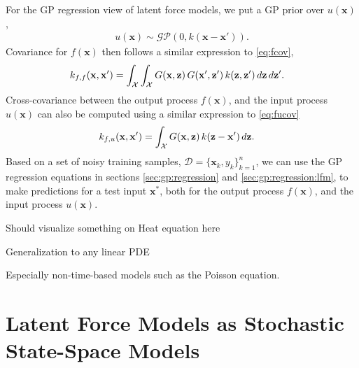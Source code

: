 \documentclass[journal]{IEEEtran}
\newcommand{\simo}[1]{{\color{red}#1}}
\begin{document}
For the GP regression view of latent force models, we put a GP prior over $u(\mathbf{x})$,
\begin{align*}
u(\mathbf{x})\sim\mathcal{GP}(0, k(\mathbf{x} - \mathbf{x}')).
\end{align*}
Covariance for $f(\mathbf{x})$ then follows a similar expression to \eqref{eq:fcov},
\begin{equation}
\begin{split}
  k_{f,f}(\mathbf{x}, \mathbf{x}') &=
  \int_{\mathcal{X}}   \int_{\mathcal{X}}
  G(\mathbf{x}, \mathbf{z}) \, G(\mathbf{x}', \mathbf{z}') \, k(\mathbf{z}, \mathbf{z}') \, d\mathbf{z} \, d\mathbf{z}'.
\end{split}
\notag
\end{equation}
Cross-covariance between the output process $f(\mathbf{x})$, and the input process $u(\mathbf{x})$ can also be computed
using a similar expression to \eqref{eq:fucov}
\begin{align}
k_{f,u}(\mathbf{x},\mathbf{x}') & = \int_{\mathcal{X}} G(\mathbf{x}, \mathbf{z})\, k(\mathbf{z} - \mathbf{x}')\, d\mathbf{z}.
\notag
\end{align}
Based on a set of noisy training samples, $\mathcal{D}=\{\mathbf{x}_k, y_k\}_{k=1}^n$, we can
use the GP regression equations in sections \ref{sec:gp:regression} and \ref{sec:gp:regression:lfm}, to make predictions
for a test input $\mathbf{x}^*$, both for the output process $f(\mathbf{x})$, and the input process $u(\mathbf{x})$.

\simo{Should visualize something on Heat equation here}

\simo{Generalization to any linear PDE}

\simo{Especially non-time-based models such as the Poisson equation.}

\section{Latent Force Models as Stochastic State-Space Models}
\end{document}
